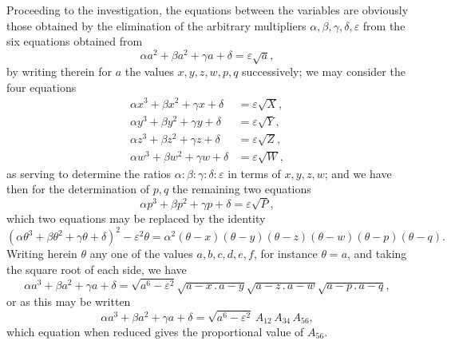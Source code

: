 \documentclass[11pt]{article}
\begin{document}
Proceeding to the investigation, the equations between the variables are obviously those obtained by the elimination of the arbitrary multipliers $\alpha,\beta,\gamma,\delta,\varepsilon$ from the six equations obtained from
\[
\alpha a^2 + \beta a^2 + \gamma a + \delta = \varepsilon\sqrt{a},
\]
by writing therein for $a$ the values $x,y,z,w,p,q$ successively; we may consider the four equations
\begin{align*}
\alpha x^3 + \beta x^2 + \gamma x + \delta &= \varepsilon\sqrt{X},\\
\alpha y^3 + \beta y^2 + \gamma y + \delta &= \varepsilon\sqrt{Y},\\
\alpha z^3 + \beta z^2 + \gamma z + \delta &= \varepsilon\sqrt{Z},\\
\alpha w^3 + \beta w^2 + \gamma w + \delta &= \varepsilon\sqrt{W},
\end{align*}
as serving to determine the ratios $\alpha:\beta:\gamma:\delta:\varepsilon$ in terms of $x,y,z,w$; and we have then for the determination of $p,q$ the remaining two equations
\[
\alpha p^3 + \beta p^2 + \gamma p + \delta = \varepsilon\sqrt{P},
\]
which two equations may be replaced by the identity
\[
(\alpha\theta^3 + \beta\theta^2 + \gamma\theta + \delta)^2 - \varepsilon^2 \theta = \alpha^2(\theta - x)(\theta - y)(\theta - z)(\theta - w)(\theta - p)(\theta - q).
\]
Writing herein $\theta$ any one of the values $a,b,c,d,e,f$, for instance $\theta = a$, and taking the square root of each side, we have
\[
\alpha a^3 + \beta a^2 + \gamma a + \delta = \sqrt{a^6 - \varepsilon^2}\sqrt{a-x\mathbin{.}a-y}\sqrt{a-z\mathbin{.}a-w}\sqrt{a-p\mathbin{.}a-q},
\]
or as this may be written
\[
\alpha a^3 + \beta a^2 + \gamma a + \delta = \sqrt{a^6 - \varepsilon^2}\, A_{12}\, A_{34}\, A_{56},
\]
which equation when reduced gives the proportional value of $A_{56}$.
\end{document}
